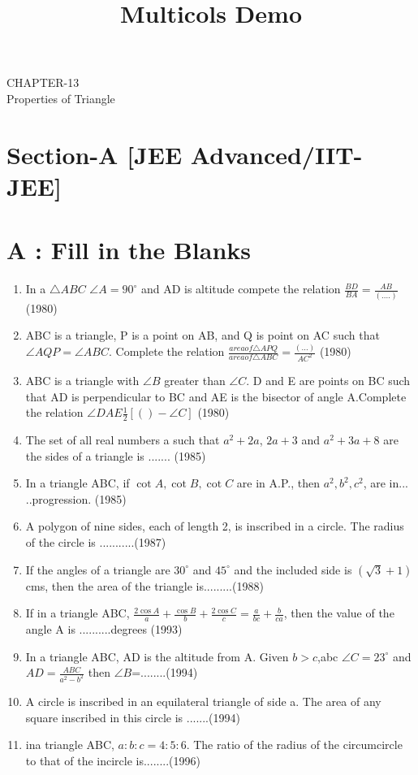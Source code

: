 \documentclass[12pt]{article}
\title{Multicols Demo}
\begin{document}
\begin{center}
\textbf\large{CHAPTER-13 \\ Properties of Triangle}

\end{center}
\section*{Section-A    [JEE Advanced/IIT-JEE]}
\section*{A    :  Fill in the Blanks}
\begin{enumerate}
\item In a $\triangle ABC$ $\angle A=90^\circ$ and AD is altitude compete the relation
$\frac{BD}{BA}=\frac{AB}{(....)}$ (1980)
\item ABC is a triangle, P is a point on AB, and Q is point on AC
such that $\angle AQP= \angle ABC$. Complete the relation
$\frac{area of \triangle APQ}{area of \triangle ABC}=\frac{(...)}{AC^2}$ 
(1980)
\item ABC is a triangle with $\angle B$ greater than $\angle C$. D and E are points on BC such that AD is perpendicular to BC and AE is the bisector of angle A.Complete the relation $\angle DAE\frac{1}{2}[()-\angle C]$ (1980)
\item The set of all real numbers a such that $a^2+ 2a$, $2a +3$ and 
$a^2+3a+8$ are the sides of a triangle is ....... (1985)
\item In a triangle ABC, if $\cot A, \cot B, \cot C$ are in A.P., then
$a^2,b^2,c^2$, are in... ..progression. (1985)
\item  A polygon of nine sides, each of length 2, is inscribed in a circle. The radius of the circle is ...........(1987)
\item If the angles of a triangle are $30^\circ$ and $45^\circ$ and the included side is $(\sqrt{3} +1)$cms, then the area of the triangle is.........(1988)
\item If in a triangle ABC, $\frac{2\cos A}{a}+\frac{\cos B}{b}+\frac{2\cos C}{c}=\frac{a}{bc}+\frac{b}{ca}$, then the value of the angle A is ..........degrees (1993)
\item In a triangle ABC, AD is the altitude from A. Given $b>c$,abc
$\angle C=23^\circ $ and $AD=\frac{ABC}{a^2-b^2}$ then $\angle B$=........(1994)
\item A circle is inscribed in an equilateral triangle of side a. The
area of any square inscribed in this circle is .......(1994)
\item ina triangle ABC, $a:b:c=4:5:6$. The ratio of the radius of
the circumcircle to that of the incircle is........(1996)
\end{enumerate}
\end{document}
